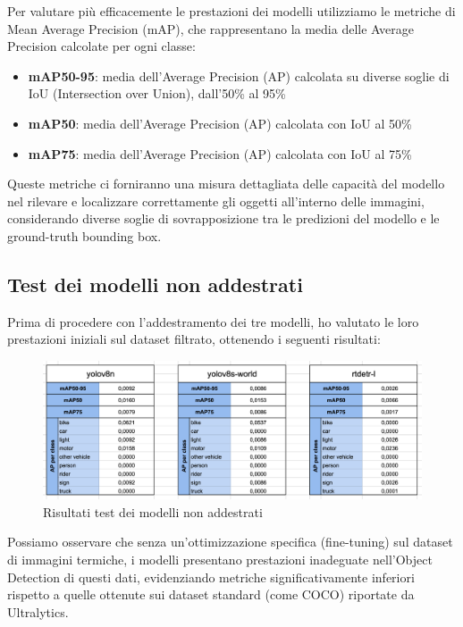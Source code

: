 Per valutare più efficacemente le prestazioni dei modelli utilizziamo le metriche di Mean Average Precision (mAP), che rappresentano la media delle Average Precision calcolate per ogni classe:

\begin{itemize}
    \item \textbf{mAP50-95}: media dell'Average Precision (AP) calcolata su diverse soglie di IoU (Intersection over Union), dall'50\% al 95\%
    \item \textbf{mAP50}: media dell'Average Precision (AP) calcolata con IoU al 50\%
    \item \textbf{mAP75}: media dell'Average Precision (AP) calcolata con IoU al 75\%
\end{itemize}

Queste metriche ci forniranno una misura dettagliata delle capacità del modello nel rilevare e localizzare correttamente gli oggetti all'interno delle immagini, considerando diverse soglie di sovrapposizione tra le predizioni del modello e le ground-truth bounding box.

\newpage

\subsection{Test dei modelli non addestrati}

Prima di procedere con l'addestramento dei tre modelli, ho valutato le loro prestazioni iniziali sul dataset filtrato, ottenendo i seguenti risultati:

\begin{figure}[ht]
    \centering
    \includegraphics[width=1\textwidth]{files/capitoli/4-sperimentazione-risultati/assets/untrained-metrics.png}
    \caption{\label{fig:untrained-metrics}Risultati test dei modelli non addestrati}
\end{figure}

Possiamo osservare che senza un'ottimizzazione specifica (fine-tuning) sul dataset di immagini termiche, i modelli presentano prestazioni inadeguate nell'Object Detection di questi dati, evidenziando metriche significativamente inferiori rispetto a quelle ottenute sui dataset standard (come COCO) riportate da Ultralytics.

